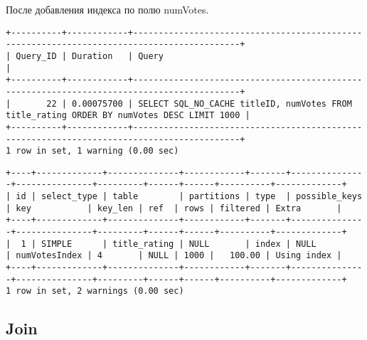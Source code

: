 \documentclass[12pt,a4paper]{article}
\begin{document}
После добавления индекса по полю numVotes.

\begin{lstlisting}[basicstyle = \tiny\ttfamily, columns = fixed]
+----------+------------+-------------------------------------------------------------------------------------------+
| Query_ID | Duration   | Query                                                                                     |
+----------+------------+-------------------------------------------------------------------------------------------+
|       22 | 0.00075700 | SELECT SQL_NO_CACHE titleID, numVotes FROM title_rating ORDER BY numVotes DESC LIMIT 1000 |
+----------+------------+-------------------------------------------------------------------------------------------+
1 row in set, 1 warning (0.00 sec)
\end{lstlisting}

\begin{lstlisting}[basicstyle = \tiny\ttfamily, columns = fixed]
+----+-------------+--------------+------------+-------+---------------+---------------+---------+------+------+----------+-------------+
| id | select_type | table        | partitions | type  | possible_keys | key           | key_len | ref  | rows | filtered | Extra       |
+----+-------------+--------------+------------+-------+---------------+---------------+---------+------+------+----------+-------------+
|  1 | SIMPLE      | title_rating | NULL       | index | NULL          | numVotesIndex | 4       | NULL | 1000 |   100.00 | Using index |
+----+-------------+--------------+------------+-------+---------------+---------------+---------+------+------+----------+-------------+
1 row in set, 2 warnings (0.00 sec)
\end{lstlisting}

\subsection{Join}
\end{document}
